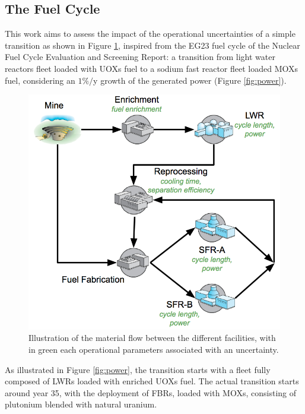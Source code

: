 \documentclass{anstrans}
\begin{document}
\subsection{The Fuel Cycle}
This work aims to assess the impact of the operational uncertainties of a simple
transition as shown in Figure \ref{fig:cycle}, inspired from the EG23 fuel cycle
of the Nuclear Fuel Cycle Evaluation and Screening Report\cite{ES}: a
transition from light water reactors fleet loaded with \glspl{UOX} fuel to a
sodium fast reactor fleet loaded \glspl{MOX} fuel, considering an $1\%/$y growth
of the generated power (Figure \ref{fig:power}).
\begin{figure}[ht] %
  \centering
  \includegraphics[scale=0.31]{cycle.png}
  \caption{Illustration of the material flow between the different facilities,
  with in green each operational parameters associated with an
  uncertainty.}\label{fig:cycle}
\end{figure}

As illustrated in Figure \ref{fig:power}, the transition starts with a fleet
fully composed of \glspl{LWR} loaded with enriched \glspl{UOX} fuel.  The actual
transition starts around year 35, with the deployment of \glspl{FBR}, loaded
with \glspl{MOX}, consisting of plutonium blended with natural
uranium.
\end{document}
